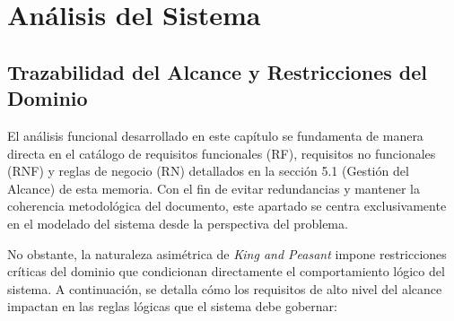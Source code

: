 \chapter{Análisis del Sistema}

\begin{abstract}
En este capítulo se aborda el modelado conceptual y funcional del sistema. Tomando como base el catálogo de requisitos y las reglas del dominio definidos previamente en la fase de planificación, se delimita el comportamiento abstracto del sistema de juego mediante el análisis del impacto de sus reglas de negocio y la definición funcional de las interacciones entre los jugadores y la plataforma, omitiendo cualquier condicionante de carácter tecnológico.
\end{abstract}

\section{Trazabilidad del Alcance y Restricciones del Dominio}

El análisis funcional desarrollado en este capítulo se fundamenta de manera directa en el catálogo de requisitos funcionales (RF), requisitos no funcionales (RNF) y reglas de negocio (RN) detallados en la sección 5.1 (Gestión del Alcance) de esta memoria. Con el fin de evitar redundancias y mantener la coherencia metodológica del documento, este apartado se centra exclusivamente en el modelado del sistema desde la perspectiva del problema.

No obstante, la naturaleza asimétrica de \textit{King and Peasant} impone restricciones críticas del dominio que condicionan directamente el comportamiento lógico del sistema. A continuación, se detalla cómo los requisitos de alto nivel del alcance impactan en las reglas lógicas que el sistema debe gobernar:

